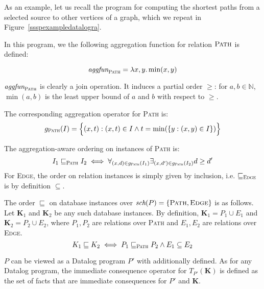 \begin{exmp}
As an example, let us recall the program for computing the shortest paths from a selected source to other vertices of a graph, which we repeat in Figure~\ref{ssspexampledatalogra}.



In this program, we the following aggregation function for relation $\textsc{Path}$ is defined:

$$ \textit{aggfun}_\textsc{Path} = \lambda x, y. \min(x, y) $$

$\textit{aggfun}_\textsc{Path}$ is clearly a join operation. It induces a partial order $\ge$: for $a, b \in \mathbb{N}$, $\min(a, b)$ is the least upper bound of $a$ and $b$ with respect to $\ge$.

The corresponding aggregation operator for \textsc{Path} is:
$$g_\textsc{Path}(I) = \Big\{(x, t): (x, t) \in I \wedge t = \min(\{y: (x, y) \in I\})\Big\} $$

The aggregation-aware ordering on instances of \textsc{Path} is:
$$ I_1 \sqsubseteq_\textsc{Path} I_2 \iff \forall_{(x, d) \in g_\textsc{Path}(I_1)} \exists_{(x, d') \in g_\textsc{Path}(I_2)} d \ge d' $$
For \textsc{Edge}, the order on relation instances is simply given by inclusion, i.e. $\sqsubseteq_\textsc{Edge}$ is by definition $\subseteq$.

The order $\sqsubseteq$ on database instances over $\textit{sch}(P) = \{\textsc{Path}, \textsc{Edge}\}$ is as follows. Let \textbf{K}$_1$ and \textbf{K}$_2$ be any such database instances. By definition, $\textbf{K}_1 = P_1 \cup E_1$ and $\textbf{K}_2 = P_2 \cup E_2$, where $P_1, P_2$ are relations over \textsc{Path} and $E_1, E_2$ are relations over \textsc{Edge}.
$$ K_1 \sqsubseteq K_2 \iff P_1 \sqsubseteq_\textsc{Path} P_2 \wedge E_1 \subseteq E_2 $$

$P$ can be viewed as a Datalog program $P'$ with \aggfun additionally defined. As for any Datalog program, the immediate consequence operator for $T_{P'}(\textbf{K})$ is defined as the set of facts that are immediate consequences for $P'$ and \textbf{K}.


\end{exmp}

